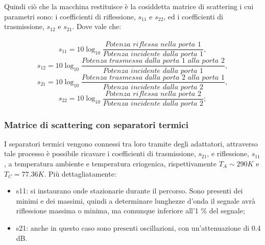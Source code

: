 Quindi ciò che la macchina restituisce è la cosiddetta matrice di scattering i cui parametri sono: i coefficienti di riflessione, \textit{$s_{11}$} e \textit{$s_{22}$}, ed i coefficienti di trasmissione, \textit{$s_{12}$} e \textit{$s_{21}$}. Dove vale che:\\\\
\begin{equation}
    s_{11}=10\log_{10} \frac{Potenza\,\,riflessa\,\,nella\,\,porta\,\,1}{Potenza\,\,incidente\,\,dalla\,\,porta\,\,1},
\end{equation}
\begin{equation}
    s_{12}=10\log_{10} \frac{Potenza\,\,trasmessa\,\,dalla\,\,porta\,\,1\,\,alla\,\,porta\,\,2}{Potenza\,\,incidente\,\,dalla\,\,porta\,\,1},
\end{equation}
\begin{equation}
    s_{21}=10\log_{10} \frac{Potenza\,\,trasmessa\,\,dalla\,\,porta\,\,2\,\,alla\,\,porta\,\,1}{Potenza\,\,incidente\,\,dalla\,\,porta\,\,2},
\end{equation}
\begin{equation}
    s_{22}=10\log_{10} \frac{Potenza\,\,riflessa\,\,nella\,\,porta\,\,2}{Potenza\,\,incidente\,\,dalla\,\,porta\,\,2};
\end{equation}



\subsubsection{Matrice di scattering con separatori termici}
\label{ssec:Matrice di scattering con separatori termici}

I separatori termici vengono connessi tra loro tramite degli adattatori, attraverso tale processo è possibile ricavare i coefficienti di trasmissione, $ s_{21} $, e riflessione, $ s_{11} $, a temperatura ambiente e temperatura criogenica, rispettivamente $ T_{A}\sim290K $ e $ T_{C} = 77.36K $. Più dettagliatamente:

\begin{itemize}
\item s11: si instaurano onde stazionarie durante il percorso. Sono presenti dei minimi e dei massimi, quindi a determinare lunghezze d'onda il segnale avrà riflessione massima o minima, ma comunque inferiore all'1 \% del segnale;
\item s21: anche in questo caso sono presenti oscillazioni, con un'attenuazione di 0.4 dB.
\end{itemize}

